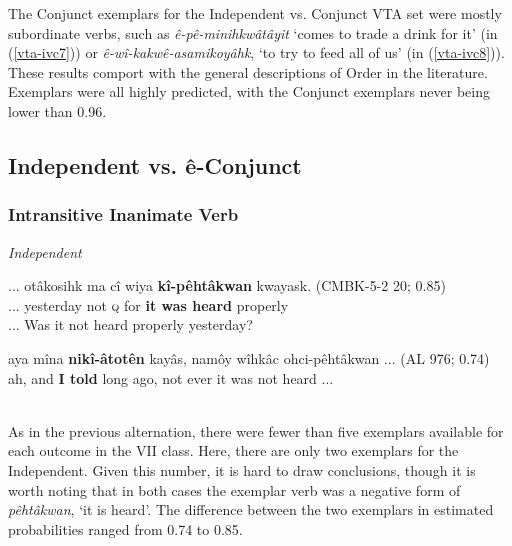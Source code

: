     The Conjunct exemplars for the Independent vs. Conjunct VTA set were mostly subordinate verbs, such as \textit{ê-pê-minihkwâtâyit} `comes to trade a drink for it' (in (\ref{vta-ivc7})) or \textit{ê-wî-kakwê-asamikoyâhk}, `to try to feed all of us' (in (\ref{vta-ivc8})). These results comport with the general descriptions of Order in the literature. Exemplars were all highly predicted, with the Conjunct exemplars never being lower than 0.96.
    
\subsection{Independent vs. ê-Conjunct}

\subsubsection{Intransitive Inanimate Verb}

\textit{Independent}

    \begin{exe}
    \ex 
    \gll ... otâkosihk ma cî wiya \textbf{kî-pêhtâkwan} kwayask. \tiny{(CMBK-5-2 20; 0.85)} \\
         ... yesterday not \textsc{q} for {\textbf{it was heard}} properly     \\
    \trans ... Was it not heard properly yesterday? \tiny{\citep[109-110]{AhenakewAlice2000}} \\
    \label{vii-ive1}
    \end{exe}
    
    \begin{exe}
    \ex 
    \gll aya mîna \textbf{nikî-âtotên} kayâs, namôy wîhkâc ohci-pêhtâkwan ...  (AL 976; 0.74) \\
         ah, and {\textbf{I told}} {long ago}, not ever {it was not heard} ... \\
    \trans  \\
    \label{vii-ive2}
    \end{exe}
    
    
    
    As in the previous alternation, there were fewer than five exemplars available for each outcome in the VII class. Here, there are only two exemplars for the Independent. Given this number, it is hard to draw conclusions, though it is worth noting that in both cases the exemplar verb was a negative form of \textit{pêhtâkwan}, `it is heard'. The difference between the two exemplars in estimated probabilities ranged from 0.74 to 0.85. 
    
